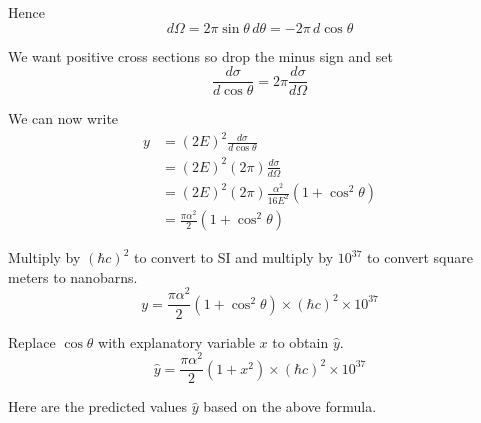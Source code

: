 \documentclass[12pt]{article}
\begin{document}
\noindent
Hence
\begin{equation*}
d\Omega=2\pi\sin\theta\,d\theta=-2\pi\,d\cos\theta
\end{equation*}

\noindent
We want positive cross sections so drop the minus sign and set
\begin{equation*}
\frac{d\sigma}{d\cos\theta}=2\pi\frac{d\sigma}{d\Omega}
\end{equation*}

\noindent
We can now write
\begin{align*}
y&=(2E)^2\frac{d\sigma}{d\cos\theta}\\
&=(2E)^2(2\pi)\frac{d\sigma}{d\Omega}\\
&=(2E)^2(2\pi)\frac{\alpha^2}{16E^2}(1+\cos^2\theta)\\
&=\frac{\pi\alpha^2}{2}(1+\cos^2\theta)
\end{align*}

\noindent
Multiply by $(\hbar c)^2$ to convert to SI
and multiply by $10^{37}$ to convert square meters to nanobarns.
\begin{equation*}
y=\frac{\pi\alpha^2}{2}(1+\cos^2\theta)\times(\hbar c)^2\times10^{37}
\end{equation*}

\noindent
Replace $\cos\theta$ with explanatory variable $x$ to obtain $\hat{y}$.
\begin{equation*}
\hat{y}=\frac{\pi\alpha^2}{2}(1+x^2)\times(\hbar c)^2\times10^{37}
\end{equation*}

\noindent
Here are the predicted values $\hat{y}$ based on the above formula.
\end{document}
